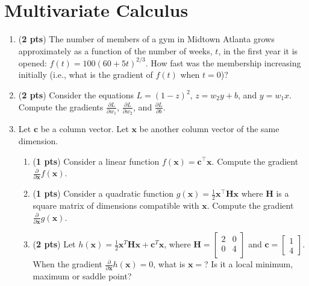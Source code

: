 \documentclass[11pt, letterpaper]{article}
\begin{document}
\section{Multivariate Calculus}
\begin{enumerate}[label=(\alph*)]
	\item (\textbf{2 pts}) The number of members of a gym in  Midtown Atlanta grows approximately as a function of the number of weeks, $t$, in the first year it is opened: $f(t) = 100 (60 + 5t)^{2/3}$. How fast was the membership increasing initially (i.e., what is the gradient of $f(t)$ when $t=0$)?
	
    \item (\textbf{2 pts}) Consider the equations $L = (1 - z)^2$, $z = w_2y + b$, and $y = w_1x$.\\Compute the gradients $\frac{\partial L}{\partial w_1}$, $\frac{\partial L}{\partial w_2}$, and $\frac{\partial L}{\partial b}$.
    

	\item Let $\mathbf{c}$ be a column vector. Let $\mathbf{x}$ be another column vector of the same dimension. 


    \begin{enumerate}[label=(\roman*)]
	   \item (\textbf{1 pts}) Consider a linear function $f(\mathbf{x})=\mathbf{c}^\top\mathbf{x}$. Compute the gradient $\frac{\partial}{\partial\mathbf{x}}f(\mathbf{x})$.
	   \item (\textbf{1 pts}) Consider a quadratic function $g(\mathbf{x})=\frac{1}{2}\mathbf{x}^\top\mathbf{H}\mathbf{x}$ where $\mathbf{H}$ is a square matrix of dimensions compatible with $\mathbf{x}$. Compute the gradient $\frac{\partial}{\partial\mathbf{x}}g(\mathbf{x})$.
	   \item (\textbf{2 pts}) Let
	   $h(\mathbf{x})=\frac{1}{2}\mathbf{x}^T\mathbf{H}\mathbf{x}+\mathbf{c}^T\mathbf{x}$, where $\mathbf{H} = \begin{bmatrix} 
                2 & 0\\
                0 & 4\\
           \end{bmatrix}$ and $\mathbf{c} = \begin{bmatrix} 1 \\ 4\end{bmatrix}$. When the gradient $\frac{\partial}{\partial\mathbf{x}}h(\mathbf{x}) = 0$, what is $\mathbf{x} =$? Is it a local minimum, maximum or saddle point? 
    \end{enumerate}
    



\end{enumerate}
\end{document}
